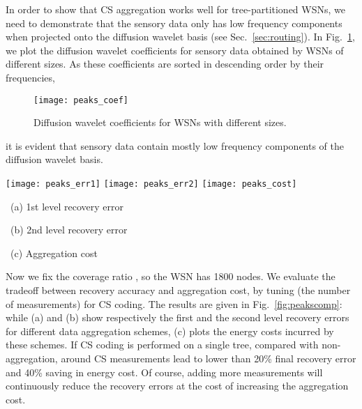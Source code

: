 \documentclass[conference]{IEEEtran}
\begin{document}
    In order to show that CS aggregation works well for tree-partitioned WSNs, we need to demonstrate that the sensory data  only has low frequency components when projected onto the diffusion wavelet basis (see Sec.~\ref{sec:routing}). In Fig.~\ref{fig:peakscoef}, we plot the diffusion wavelet coefficients for sensory data obtained by WSNs of different sizes. As these coefficients are sorted in descending order by their frequencies,
    \begin{figure}[ht]
      \begin{center}
        \texttt{[image: peaks\_coef]}
        \caption{Diffusion wavelet coefficients for WSNs with different sizes.}
        \label{fig:peakscoef}
      \end{center}
\end{figure}
it is evident that sensory data contain mostly low frequency components of the diffusion wavelet basis.
    \begin{figure*}[t]
\begin{center}
        \texttt{[image: peaks\_err1]}
	    \texttt{[image: peaks\_err2]}
        \texttt{[image: peaks\_cost]}
        \parbox{.33\textwidth}{\center\scriptsize~(a) 1st level recovery error}
        \parbox{.33\textwidth}{\center\scriptsize~(b) 2nd level recovery error}
        \parbox{.32\textwidth}{\center\scriptsize~(c) Aggregation cost}
\caption{Comparisons based on synthetic data. Here ST/MT corresponds to CDA on single tree or multiple trees. Whereas  refers to the CS measurements in ST case,  denotes the measurements used for each subtree. IR and JR are short for independent recovery and joint recovery, respectively.}
        \label{fig:peakscomp}
      \end{center}
\end{figure*}

    Now we fix the coverage ratio , so the WSN has 1800 nodes. We evaluate the tradeoff between recovery accuracy and aggregation cost, by tuning  (the number of measurements) for CS coding. The results are given in Fig.~\ref{fig:peakscomp}: while (a) and (b) show respectively the first and the second level recovery errors for different data aggregation schemes, (c) plots the energy costs incurred by these schemes.
    If CS coding is performed on a single tree, compared with non-aggregation, around  CS measurements lead to lower than 20\% final recovery error and 40\% saving in energy cost. Of course, adding more measurements will continuously reduce the recovery errors at the cost of increasing the aggregation cost.
\end{document}

